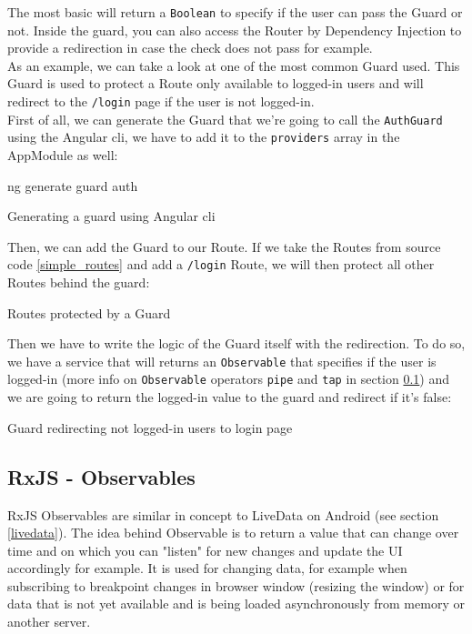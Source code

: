\documentclass[twoside, openright,11pt,a4paper]{book}
\newenvironment{code}{\captionsetup{type=listing}}{}
\begin{document}
The most basic will return a \verb+Boolean+ to specify if the user can pass the Guard or not. Inside the guard, you can also access the Router by Dependency Injection to provide a redirection in case the check does not pass for example. \\

As an example, we can take a look at one of the most common Guard used. This Guard is used to protect a Route only available to logged-in users and will redirect to the \verb+/login+ page if the user is not logged-in.\\

First of all, we can generate the Guard that we're going to call the \verb+AuthGuard+ using the Angular \gls{cli}, we have to add it to the \verb+providers+ array in the AppModule as well:
\begin{code}
	\begin{shell}
ng generate guard auth
	\end{shell}
	\caption{Generating a guard using Angular \gls{cli}}
\end{code}
Then, we can add the Guard to our Route. If we take the Routes from source code \ref{simple_routes} and add a \verb+/login+ Route, we will then protect all other Routes behind the guard:
\begin{code}
	\caption{Routes protected by a Guard}
\end{code}

Then we have to write the logic of the Guard itself with the redirection. To do so, we have a service that will returns an \verb+Observable+ that specifies if the user is logged-in (more info on \verb+Observable+ operators \verb+pipe+ and \verb+tap+ in section \ref{observables}) and we are going to return the logged-in value to the guard and redirect if it's false:
\begin{code}
	\caption{Guard redirecting not logged-in users to login page}
	\label{authGuard}
\end{code}
\subsection{RxJS - Observables}
\label{observables}
RxJS Observables\cite{angular:doc:observables} are similar in concept to LiveData on Android (see section \ref{livedata}). The idea behind Observable is to return a value that can change over time and on which you can "listen" for new changes and update the UI accordingly for example. It is used for changing data, for example when subscribing to breakpoint changes in browser window (resizing the window) or for data that is not yet available and is being loaded asynchronously from memory or another server. \\
\end{document}
